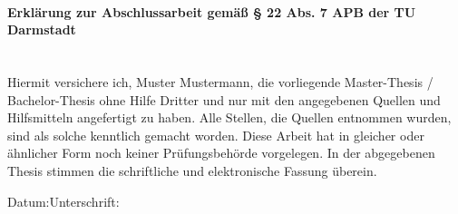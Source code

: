 \vspace{11pt}
\paragraph{Erklärung zur Abschlussarbeit gemäß § 22 Abs. 7 APB der TU Darmstadt}\noindent\\
Hiermit versichere ich, Muster Mustermann, die vorliegende Master-Thesis / Bachelor-Thesis ohne Hilfe Dritter und nur mit den angegebenen Quellen und Hilfsmitteln angefertigt zu haben. Alle Stellen, die Quellen entnommen wurden, sind als solche kenntlich gemacht worden. Diese Arbeit hat in gleicher oder ähnlicher Form noch keiner Prüfungsbehörde vorgelegen. \newline
In der abgegebenen Thesis stimmen die schriftliche und elektronische Fassung überein.\vspace{40pt}

\noindent Datum:\hspace{0.4\textwidth}Unterschrift:
\vspace*{2cm}